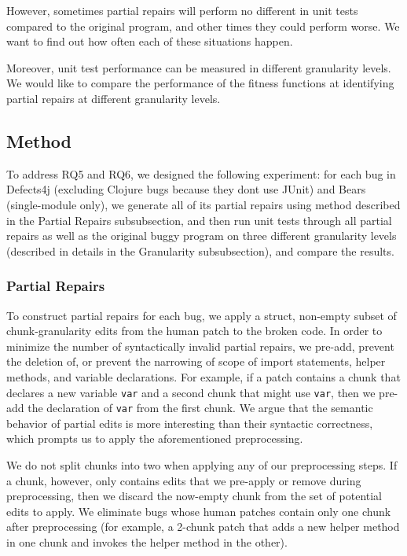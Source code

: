 \documentclass[sigconf, timestamp-false, anonymous=true]{acmart}
\begin{document}
However, sometimes partial repairs will perform no different in unit tests compared 
to the original program, and other times they could perform worse. We want to find 
out how often each of these situations happen.

Moreover, unit test performance can be measured in different granularity levels. 
We would like to compare the performance of the fitness functions at identifying 
partial repairs at different granularity levels.


\subsection{Method}

To address RQ5 and RQ6, we designed the following experiment: for each bug in 
Defects4j 
(excluding Clojure bugs because they dont use JUnit) 
and Bears (single-module only), we generate all of its partial repairs using method described in 
the Partial Repairs subsubsection, and then run unit tests through all partial repairs
as well as the original buggy program on three different granularity levels (described
in details in the Granularity subsubsection), and compare the results.

\subsubsection{Partial Repairs}

To construct partial repairs for each bug, we apply a struct, non-empty subset 
of chunk-granularity edits from the human patch to the broken code.
In order to minimize the number of syntactically invalid partial repairs, 
we pre-add, prevent the deletion of, or prevent the narrowing of scope of 
import statements, helper methods, and variable declarations.
For example, if a patch contains a chunk that declares a new variable 
\texttt{var} and a second chunk that might use \texttt{var}, then we 
pre-add the declaration of \texttt{var} from the first chunk. 
We argue that the semantic behavior of partial edits is more interesting 
than their syntactic correctness, which prompts us to apply the 
aforementioned preprocessing.

We do not split chunks into two when applying any of our preprocessing steps. 
If a chunk, however, only contains edits that we pre-apply or remove during 
preprocessing, then we discard the now-empty chunk from the set of 
potential edits to apply. We eliminate bugs whose human patches contain only 
one chunk after preprocessing (for example, a 2-chunk patch that adds a new 
helper method in one chunk and invokes the helper method in the other). 
\end{document}
